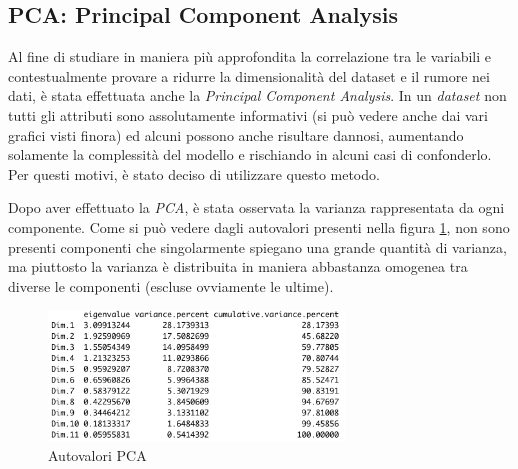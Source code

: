    
    
    
\subsection{PCA: Principal Component Analysis}
    Al fine di studiare in maniera più approfondita la correlazione tra le variabili e contestualmente provare a ridurre la dimensionalità del dataset e il rumore nei dati, è stata effettuata anche la \textit{Principal Component Analysis}. In un \textit{dataset} non tutti gli attributi sono assolutamente informativi (si può vedere anche dai vari grafici visti finora) ed alcuni possono anche risultare dannosi, aumentando solamente la complessità del modello e rischiando in alcuni casi di confonderlo. Per questi motivi, è stato deciso di utilizzare questo metodo. 
    
    Dopo aver effettuato la \textit{PCA}, è stata osservata la varianza rappresentata da ogni componente. Come si può vedere dagli autovalori presenti nella figura \ref{fig:out_eig}, non sono presenti componenti che singolarmente spiegano una grande quantità di varianza, ma piuttosto la varianza è distribuita in maniera abbastanza omogenea tra diverse le componenti (escluse ovviamente le ultime). 
    
    \begin{figure}[!h]
        \includegraphics[width=0.7\textwidth]{img/autovalori_pca.png}
        \centering
        \caption{Autovalori PCA}
        \label{fig:out_eig}
    \end{figure} 
    
